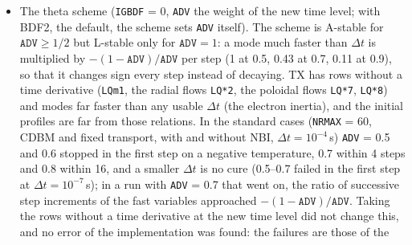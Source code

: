 \documentclass[11pt]{article}
\begin{document}
\begin{itemize}
  that error), and the densities, temperatures and global quantities far below it.  It takes
  13--65\% more sweeps per step (1\,s at \texttt{NRMAX} = 60, 0.3\,s at 120, 0.05\,s at 240 with
  $\Delta t = 5\times10^{-5}$\,s) and 19--25\% more run time at \texttt{NRMAX} = 60, 20--42\% at 120
  and 15--23\% at 240 (\texttt{NANDER} = $-20$, or $-50$ at 240; 36--59\% with \texttt{NANDER} = 0).
  The steps that reach \texttt{ICMAX} and are taken again at $\Delta t/2$ are those of $10^{-3}$, all
  within the first 3.2\,ms, with one more in three of the fourteen cases.  At \texttt{NRMAX} = 240
  the error against $10^{-6}$ (0.05\,s) is more than an order of magnitude below the
  time-discretization error.  A smaller $\Delta t$ needs a smaller \texttt{EPS}: the test does not
  depend on $\Delta t$, and the number of steps grows.  Below about
  $10^{-7}$ at \texttt{NRMAX} = 60 ($10^{-6}$ at 120) the radial beam flow (\texttt{LQb2}) reaches its
  rounding floor and steps run to \texttt{ICMAX}.  Inputs that set \texttt{EPS} are unchanged, and
  \texttt{LOAD} takes the value in the file (a file written with the former default continues with
  $10^{-3}$).  \texttt{parm/txparm.v552default} sets \texttt{EPS} = $10^{-3}$.
\item The theta scheme (\texttt{IGBDF} = 0, \texttt{ADV} the weight of the new time level; with BDF2,
  the default, the scheme sets \texttt{ADV} itself).  The scheme is A-stable for
  $\texttt{ADV} \ge 1/2$ but L-stable only for $\texttt{ADV} = 1$: a mode much faster than $\Delta t$ is
  multiplied by $-(1-\texttt{ADV})/\texttt{ADV}$ per step (1 at 0.5, 0.43 at 0.7, 0.11 at 0.9), so that
  it changes sign every step instead of decaying.  TX has rows without a time derivative
  (\texttt{LQm1}, the radial flows \texttt{LQ*2}, the poloidal flows \texttt{LQ*7}, \texttt{LQ*8}) and
  modes far faster than any usable $\Delta t$ (the electron inertia), and the initial profiles are far
  from those relations.  In the standard cases (\texttt{NRMAX} = 60, CDBM and fixed transport, with and
  without NBI, $\Delta t = 10^{-4}$\,s) \texttt{ADV} = 0.5 and 0.6 stopped in the first step on a
  negative temperature, 0.7 within 4 steps and 0.8 within 16, and a smaller $\Delta t$ is no cure
  (0.5--0.7 failed in the first step at $\Delta t = 10^{-7}$\,s); in a run with \texttt{ADV} = 0.7 that
  went on, the ratio of successive step increments of the fast variables approached
  $-(1-\texttt{ADV})/\texttt{ADV}$.  Taking the rows without a time derivative at the new time level
  did not change this, and no error of the implementation was found: the failures are those of the

\end{itemize}
\end{document}

